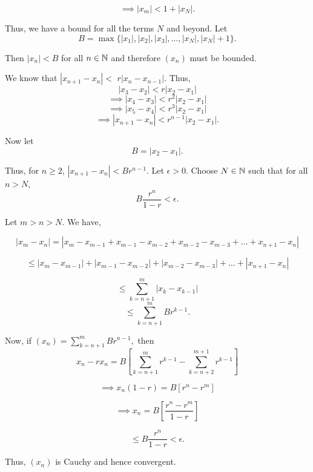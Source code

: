 \documentclass{report}
\begin{document}
$$ \implies \left| x_m \right| < 1 + \left|x_N\right|.$$


Thus, we have a bound for all the terms $N$ and beyond. Let $$ B = \max\{|x_1|, |x_2|, |x_3|, \dots, |x_N|, |x_N| + 1\}.$$

Then $|x_n| < B$ for all $n \in \NN$ and therefore $(x_n)$ must be bounded.

\bigskip

\pagebreak
{}

\begin{myproof}
We know that $\left|x_{n+1}-x_n\right|<$ $r\left|x_n-x_{n-1}\right|.$ Thus, $$\left|x_{3}-x_2\right|< r\left|x_2-x_{1}\right|$$
$$ \implies \left|x_{4}-x_3\right|< r^2\left|x_2-x_{1}\right|$$
$$ \implies \left|x_{5}-x_4\right|< r^3\left|x_2-x_{1}\right|$$
$$ \implies \left|x_{n+1}-x_n\right|< r^{n-1}\left|x_2-x_{1}\right|.$$


Now let 
$$B=\left|x_{2}-x_1\right|.$$

Thus, for $n \geq 2$, $|x_{n+1}-x_n|< Br^{n-1}.$ Let $\epsilon > 0.$ Choose $N\in\NN$ such that for all $n > N$, $$B\frac{ r^{n}}{1-r} < \epsilon.$$

Let $m > n > N.$ We have,

$$|x_m - x_n|= |x_m - x_{m-1} + x_{m-1} - x_{m-2}  + x_{m-2} - x_{m-3}+ \dots+ x_{n+1} -  x_{n}| $$

$$\leq |x_m - x_{m-1}| + |x_{m-1} - x_{m-2}|  + 
|x_{m-2} -  x_{m-3}| + \dots + | x_{n+1} -  x_{n}| $$

$$ \leq \sum_{k={n+1}}^m |x_k - x_{k-1}|$$
$$ \leq \sum_{k={n+1}}^{m}B r^{k-1}.$$


Now, if $(x_n)= \sum_{k={n+1}}^{m}Br^{n-1}, $ then
$$x_n - rx_n = B\left[\sum_{k={n+1}}^{m}r^{k-1} - \sum_{k={n+2}}^{m+1}r^{k-1}\right]$$

$$\implies x_n(1 - r) = B\left[r^n - r^{m}\right] $$

$$\implies x_n = B\left[\frac{r^n - r^{m}}{1 - r}\right] $$

$$\leq B\frac{r^n}{1 - r}  < \epsilon.$$


Thus, $(x_n)$ is Cauchy and hence convergent.

\end{myproof}
\pagebreak
\end{document}
